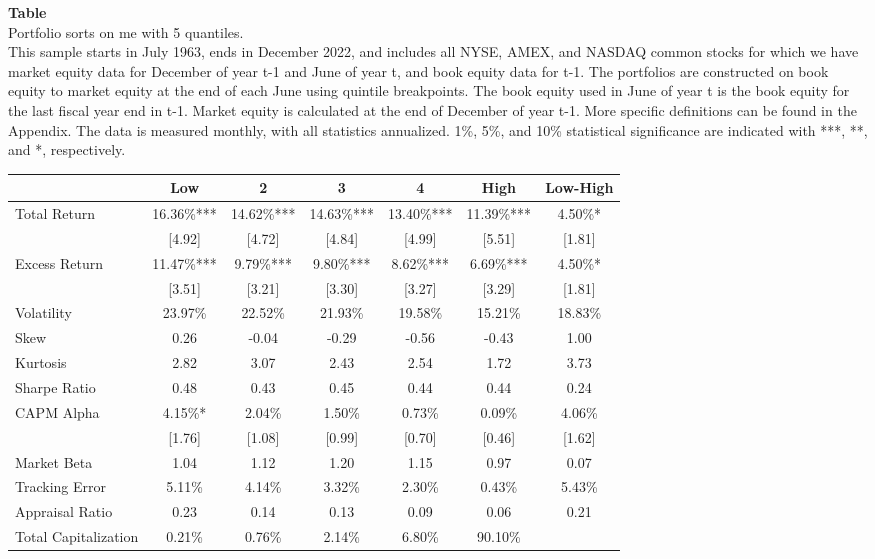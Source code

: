\begin{table*}[ht!]
\raggedright
{}
\label{tab: summary_stats_me_with_5_quantiles}
\textbf{Table \thetable} \\
Portfolio sorts on me with 5 quantiles. \\
\hspace*{1em}This sample starts in July 1963, ends in December 2022, and includes all NYSE, AMEX, and NASDAQ common stocks for which we have market equity data for December of year t-1 and June of year t, and book equity data for t-1. The portfolios are constructed on book equity to market equity at the end of each June using quintile breakpoints.  The book equity used in June of year t is the book equity for the last fiscal year end in t-1.  Market equity is calculated at the end of December of year t-1.  More specific definitions can be found in the Appendix.  The data is measured monthly, with all statistics annualized.  1\%, 5\%, and 10\% statistical significance are indicated with ***, **, and *, respectively. \\
\vspace{0.5em}
\centering
\begin{adjustbox}{max width=\textwidth}
\begin{tabular}{@{}lcccccc@{}}
\toprule
 & Low & 2 & 3 & 4 & High & Low-High \\
\midrule
Total Return & 16.36\%*** & 14.62\%*** & 14.63\%*** & 13.40\%*** & 11.39\%*** & 4.50\%* \\
 & [4.92] & [4.72] & [4.84] & [4.99] & [5.51] & [1.81] \\
Excess Return & 11.47\%*** & 9.79\%*** & 9.80\%*** & 8.62\%*** & 6.69\%*** & 4.50\%* \\
 & [3.51] & [3.21] & [3.30] & [3.27] & [3.29] & [1.81] \\
Volatility & 23.97\% & 22.52\% & 21.93\% & 19.58\% & 15.21\% & 18.83\% \\
Skew & 0.26 & -0.04 & -0.29 & -0.56 & -0.43 & 1.00 \\
Kurtosis & 2.82 & 3.07 & 2.43 & 2.54 & 1.72 & 3.73 \\
Sharpe Ratio & 0.48 & 0.43 & 0.45 & 0.44 & 0.44 & 0.24 \\
CAPM Alpha & 4.15\%* & 2.04\% & 1.50\% & 0.73\% & 0.09\% & 4.06\% \\
 & [1.76] & [1.08] & [0.99] & [0.70] & [0.46] & [1.62] \\
Market Beta & 1.04 & 1.12 & 1.20 & 1.15 & 0.97 & 0.07 \\
Tracking Error & 5.11\% & 4.14\% & 3.32\% & 2.30\% & 0.43\% & 5.43\% \\
Appraisal Ratio & 0.23 & 0.14 & 0.13 & 0.09 & 0.06 & 0.21 \\
Total Capitalization & 0.21\% & 0.76\% & 2.14\% & 6.80\% & 90.10\% &  \\
\bottomrule
\end{tabular}
\end{adjustbox}
\end{table*}